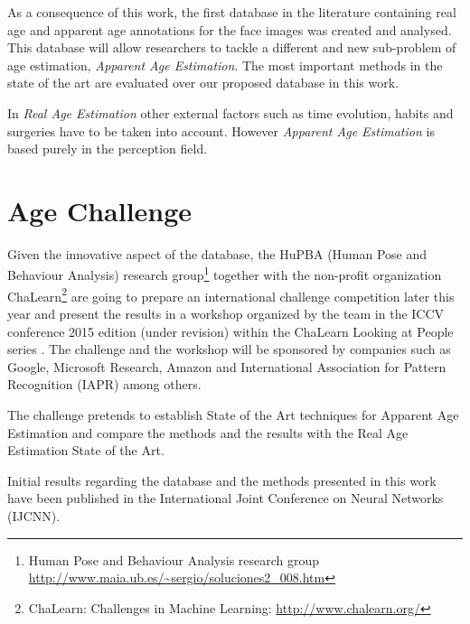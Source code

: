 As a consequence of this work, the first database in the literature containing real age and apparent age annotations for the face images was created and analysed. This database will allow researchers to tackle a different and new sub-problem of age estimation, \textit{Apparent Age Estimation}. The most important methods in the state of the art are evaluated over our proposed database in this work.

In \textit{Real Age Estimation} other external factors such as time evolution, habits and surgeries have to be taken into account. However \textit{Apparent Age Estimation} is based purely in the perception field.


\section{Age Challenge}

Given the innovative aspect of the database, the HuPBA (Human Pose and Behaviour Analysis) research group\footnote{Human Pose and Behaviour Analysis research group\\ \url{http://www.maia.ub.es/~sergio/soluciones2_008.htm}} together with the non-profit organization  ChaLearn\footnote{ChaLearn: Challenges in Machine Learning: \url{http://www.chalearn.org/}} are going to prepare an international challenge competition later this year and present the results in a workshop organized by the team in the ICCV conference 2015 edition (under revision) within the ChaLearn Looking at People series \cite{LaP} \cite{SergioEscalera2014} \cite{Escalera:2013:MGR:2522848.2532595} \cite{conf/icmi/EscaleraGBRGAESASBS13}. The challenge and the workshop will be sponsored by companies such as Google, Microsoft Research, Amazon and International Association for Pattern Recognition (IAPR) among others.

The challenge pretends to establish State of the Art techniques for Apparent Age Estimation and compare the methods and the results with the Real Age Estimation State of the Art.

Initial results regarding the database and the methods presented in this work have been published in the International Joint Conference on Neural Networks (IJCNN).


